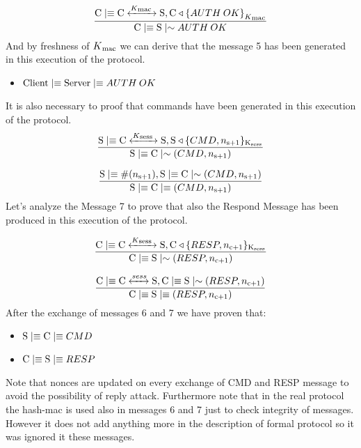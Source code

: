 \[
	\frac{\textnormal{C} \mid\equiv \textnormal{C} \xleftrightarrow{K\textsubscript{mac }} \textnormal{S}, \textnormal{C} \triangleleft { \{ AUTH\:OK \} }_{K\textsubscript{mac}}}
	{\textnormal{C} \mid\equiv \textnormal{S} \mid\sim {AUTH\:OK}} 
\]
And by freshness of \(K\textsubscript{mac}\) we can derive that the message 5 has been generated in this execution of the protocol. 
\begin{itemize}
	\item $\textnormal{Client} \mid\equiv \textnormal{Server}\mid\equiv AUTH\:OK$
\end{itemize}
It is also necessary to proof that commands have been generated in this execution of the protocol.
\[ \frac{\textnormal{S} \mid\equiv \textnormal{C} \xleftrightarrow{K\textsubscript{sess }} \textnormal{S}, \textnormal{S} \triangleleft \lbrace CMD, n\textsubscript{s+1} \rbrace \textsubscript{K\textsubscript{sess}} }{ \textnormal{S} \mid\equiv \textnormal{C} \mid\sim (CMD,n\textsubscript{s+1}) }\]

\[ \frac{ \textnormal{S} \mid\equiv \#(n\textsubscript{s+1}), \textnormal{S} \mid\equiv \textnormal{C} \mid\sim (CMD,n\textsubscript{s+1}) } 
        {\textnormal{S} \mid\equiv \textnormal{C} \mid\equiv (CMD,n\textsubscript{s+1})}\]
Let's analyze the Message 7 to prove that also the Respond Message has been produced in this execution of the protocol.

\[ \frac{\textnormal{C} \mid\equiv \textnormal{C} \xleftrightarrow{K\textsubscript{sess }} \textnormal{S}, \textnormal{C} \triangleleft \lbrace RESP, n\textsubscript{c+1} \rbrace \textsubscript{K\textsubscript{sess}}}{ \textnormal{C} \mid\equiv \textnormal{S} \mid\sim (RESP,n\textsubscript{c+1})} 
\]

\[ \frac{\textnormal{C} \mid\equiv \textnormal{C} \xleftrightarrow{sess } \textnormal{S}, \textnormal{C} \mid\equiv \textnormal{S} \mid\sim (RESP,n\textsubscript{c+1}) }{\textnormal{C} \mid\equiv \textnormal{S} \mid\equiv (RESP,n\textsubscript{c+1})}
\]
After the exchange of messages 6 and 7 we have proven that:
\begin{itemize}
	\item \( \textnormal{S} \mid\equiv \textnormal{C} \mid\equiv CMD\)
	\item \( \textnormal{C} \mid\equiv \textnormal{S} \mid\equiv RESP\)
\end{itemize}
Note that nonces are updated on every exchange of CMD and RESP message to avoid the possibility of reply attack. Furthermore note that in the real protocol the hash-mac is used also in messages 6 and 7 just to check integrity of messages. However it does not add anything more in the description of formal protocol so it was ignored it these messages.
